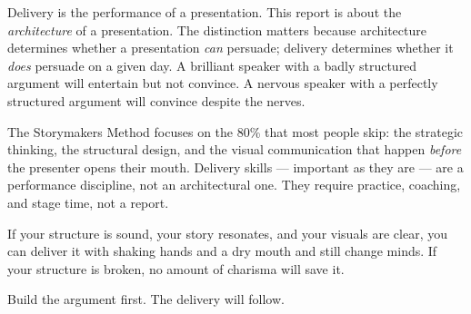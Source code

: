 \begin{insightbox}
Delivery is the performance of a presentation. This report is about the \emph{architecture} of a presentation. The distinction matters because architecture determines whether a presentation \emph{can} persuade; delivery determines whether it \emph{does} persuade on a given day. A brilliant speaker with a badly structured argument will entertain but not convince. A nervous speaker with a perfectly structured argument will convince despite the nerves.

The Storymakers Method focuses on the 80\% that most people skip: the strategic thinking, the structural design, and the visual communication that happen \emph{before} the presenter opens their mouth. Delivery skills --- important as they are --- are a performance discipline, not an architectural one. They require practice, coaching, and stage time, not a report.

If your structure is sound, your story resonates, and your visuals are clear, you can deliver it with shaking hands and a dry mouth and still change minds. If your structure is broken, no amount of charisma will save it.

Build the argument first. The delivery will follow.
\end{insightbox}


\clearpage
